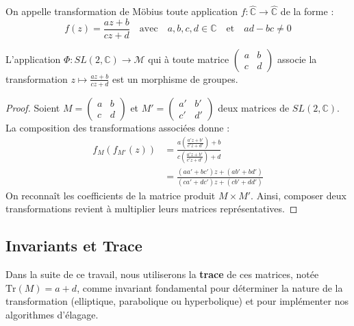 \begin{definition}
On appelle transformation de Möbius toute application $f : \hat{\mathbb{C}} \to \hat{\mathbb{C}}$ de la forme :
\[ f(z) = \frac{az+b}{cz+d} \quad \text{avec} \quad a,b,c,d \in \mathbb{C} \quad \text{et} \quad ad-bc \neq 0 \]
\end{definition}

\begin{theorem}
L'application $\Phi : SL(2, \mathbb{C}) \to \mathcal{M}$ qui à toute matrice $\begin{pmatrix} a & b \\ c & d \end{pmatrix}$ associe la transformation $z \mapsto \frac{az+b}{cz+d}$ est un morphisme de groupes.
\end{theorem}

\begin{proof}
Soient $M = \begin{pmatrix} a & b \\ c & d \end{pmatrix}$ et $M' = \begin{pmatrix} a' & b' \\ c' & d' \end{pmatrix}$ deux matrices de $SL(2, \mathbb{C})$. 
La composition des transformations associées donne :
\begin{align*}
f_M(f_{M'}(z)) &= \frac{a \left( \frac{a'z+b'}{c'z+d'} \right) + b}{c \left( \frac{a'z+b'}{c'z+d'} \right) + d} \\
&= \frac{(aa'+bc')z + (ab'+bd')}{(ca'+dc')z + (cb'+dd')}
\end{align*}
On reconnaît les coefficients de la matrice produit $M \times M'$. Ainsi, composer deux transformations revient à multiplier leurs matrices représentatives.
\end{proof}

\subsection{Invariants et Trace}
Dans la suite de ce travail, nous utiliserons la \textbf{trace} de ces matrices, notée $\mathrm{Tr}(M) = a+d$, comme invariant fondamental pour déterminer la nature de la transformation (elliptique, parabolique ou hyperbolique) et pour implémenter nos algorithmes d'élagage.